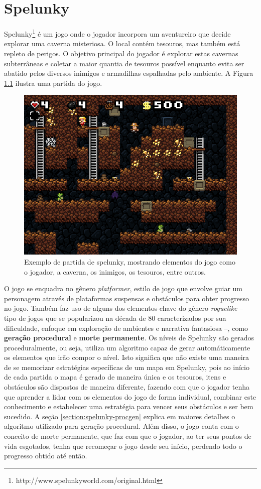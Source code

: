 \chapter{\label{chap:spelunky}Spelunky}
Spelunky\footnote{http://www.spelunkyworld.com/original.html} é um jogo onde o
jogador incorpora um aventureiro que decide explorar uma caverna misteriosa. O
local contém tesouros, mas também está repleto de perigos. O objetivo principal
do jogador é explorar estas cavernas subterrâneas e coletar a maior quantia de
tesouros possível enquanto evita ser abatido pelos diversos inimigos e
armadilhas espalhadas pelo ambiente. A Figura \ref{fig:spelunky-gameplay}
ilustra uma partida do jogo.

\begin{figure}[htb!]
\centering
\includegraphics[width=.65\textwidth]{fig/spelunky-pc-screen.png}
\caption{\label{fig:spelunky-gameplay}Exemplo de partida de spelunky, mostrando
elementos do jogo como o jogador, a caverna, os inimigos, os tesouros, entre
outros.}
\end{figure}

O jogo se enquadra no gênero \textit{platformer}, estilo de jogo que envolve
guiar um personagem através de plataformas suspensas e obstáculos para obter
progresso no jogo. Também faz uso de alguns dos elementos-chave do gênero
\textit{roguelike} -- tipo de jogos que se popularizou na década de 80
caracterizados por sua dificuldade, enfoque em exploração de ambientes e
narrativa fantasiosa --, como \textbf{geração procedural} e \textbf{morte
permanente}. Os níveis de Spelunky são gerados proceduralmente, ou seja, utiliza
um algoritmo capaz de gerar automáticamente os elementos que irão compor o
nível. Isto significa que não existe uma maneira de se memorizar estratégias
específicas de um mapa em Spelunky, pois ao início de cada partida o mapa é
gerado de maneira única e os tesouros, itens e obstáculos são dispostos de
maneira diferente, fazendo com que o jogador tenha que aprender a lidar com os
elementos do jogo de forma individual, combinar este conhecimento e estabelecer
uma estratégia para vencer seus obstáculos e ser bem sucedido. A seção
\ref{section:spelunky-procgen} explica em maiores detalhes o algoritmo utilizado
para geração procedural. Além disso, o jogo conta com o conceito de morte
permanente, que faz com que o jogador, ao ter seus pontos de vida esgotados,
tenha que recomeçar o jogo desde seu início, perdendo todo o progresso obtido
até então.


